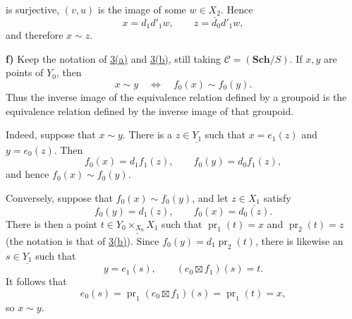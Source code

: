 \noindent is surjective, \((v,u)\) is the image of some
\(w\in\underline{X_2}\). Hence
\[
  x=d_1d'_1w,\qquad z=d_0d'_1w,
\]
and therefore \(x\sim z\).

\medskip
{}\label{par:sga3-V-3-f}%
\noindent\textbf{f)} Keep the notation of \hyperref[par:sga3-V-3-a]{3(a)} and \hyperref[par:sga3-V-3-b]{3(b)}, still taking
\(\mathscr C=(\mathbf{Sch}/S)\). If \(x,y\) are points of \(Y_0\), then
\[
  x\sim y\quad\Longleftrightarrow\quad f_0(x)\sim f_0(y).
\]
Thus the inverse image of the equivalence relation defined by a groupoid
is the equivalence relation defined by the inverse image of that
groupoid.

Indeed, suppose that \(x\sim y\). There is a \(z\in\underline{Y_1}\)
such that \(x=e_1(z)\) and \(y=e_0(z)\). Then
\[
  f_0(x)=d_1f_1(z),\qquad f_0(y)=d_0f_1(z),
\]
and hence \(f_0(x)\sim f_0(y)\).

Conversely, suppose that \(f_0(x)\sim f_0(y)\), and let
\(z\in\underline{X_1}\) satisfy
\[
  f_0(y)=d_1(z),\qquad f_0(x)=d_0(z).
\]
There is then a point
\(t\in\underline{Y_0\times_{X_0}X_1}\) such that
\(\operatorname{pr}_1(t)=x\) and \(\operatorname{pr}_2(t)=z\) (the notation
is that of \hyperref[par:sga3-V-3-b]{3(b)}). Since
\(f_0(y)=d_1\operatorname{pr}_2(t)\), there is likewise an
\(s\in\underline{Y_1}\) such that
\[
  y=e_1(s),\qquad (e_0\boxtimes f_1)(s)=t.
\]
It follows that
\[
  e_0(s)=\operatorname{pr}_1(e_0\boxtimes f_1)(s)
  =\operatorname{pr}_1(t)=x,
\]
so \(x\sim y\).
